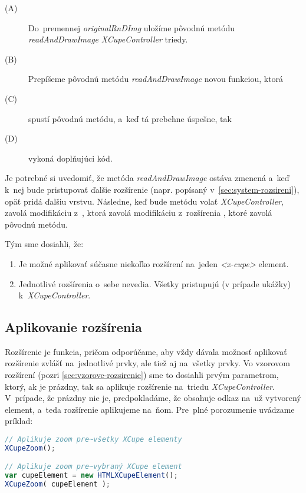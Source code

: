 \begin{description}
	\item [(A)] Do~premennej \emph{originalRnDImg} uložíme pôvodnú metódu \emph{readAndDrawImage} \emph{XCupeController} triedy. 
	\item [(B)] Prepíšeme pôvodnú metódu \emph{readAndDrawImage} novou funkciou, ktorá
	\item [(C)] spustí pôvodnú metódu, a~keď tá prebehne úspešne, tak
	\item [(D)] vykoná doplňujúci kód.
\end{description}

Je potrebné si uvedomiť, že metóda \emph{readAndDrawImage} ostáva zmenená a~keď k~nej bude pristupovať ďalšie rozšírenie (napr.  popísaný v~\ref{sec:system-rozsireni}), opäť pridá ďalšiu vrstvu. Následne, keď bude metódu volať \emph{XCupeController}, zavolá modifikáciu z~, ktorá zavolá modifikáciu z~rozšírenia , ktoré zavolá pôvodnú metódu.


Tým sme dosiahli, že:

\begin{enumerate}
	\item Je možné aplikovať súčasne niekoľko rozšírení na~jeden \emph{<x-cupe>} element.
	\item Jednotlivé rozšírenia o~sebe nevedia. Všetky pristupujú (v prípade ukážky) k~\emph{XCupeController}. 
\end{enumerate}


\subsection{Aplikovanie rozšírenia}

Rozšírenie je funkcia, pričom odporúčame, aby vždy dávala možnosť aplikovať rozšírenie zvlášť na~jednotlivé prvky, ale tiež aj na~všetky prvky. Vo vzorovom rozšírení  (pozri \ref{sec:vzorove-rozsirenie}) sme to dosiahli prvým parametrom, ktorý, ak je prázdny, tak sa aplikuje rozšírenie na~triedu \emph{XCupeController}. V~prípade, že prázdny nie je, predpokladáme, že obsahuje odkaz na~už vytvorený element, a~teda rozšírenie aplikujeme na~ňom. Pre~plné porozumenie uvádzame príklad:

\begin{lstlisting}[language=JavaScript]
// Aplikuje zoom pre~všetky XCupe elementy
XCupeZoom();

// Aplikuje zoom pre~vybraný XCupe element
var cupeElement = new HTMLXCupeElement();
XCupeZoom( cupeElement );
\end{lstlisting}


